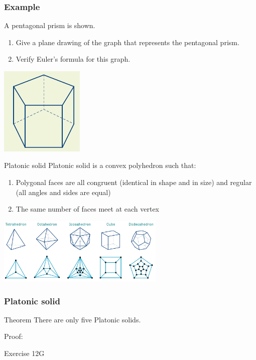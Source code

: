 \documentclass[
	11pt, %
]{beamer}
\begin{document}
\begin{frame}[t]
    \frametitle{Example}
    A pentagonal prism is shown.
    \begin{enumerate}
        \item Give a plane drawing of the graph that represents the
        pentagonal prism.
        \item Verify Euler’s formula for this graph.
    \end{enumerate}
    \includegraphics[width=4cm]{Poly2.png}
\end{frame}

\begin{frame}{Platonic solid}
    Platonic solid is a convex polyhedron such that:
    \begin{enumerate}
        \item Polygonal faces are all congruent (identical in shape and in size) and regular (all angles and sides are equal)
        \item The same number of faces meet at each vertex
    \end{enumerate}
    \begin{center}
        \includegraphics[width=8cm]{Poly3.png}
    \end{center}

\end{frame}

\begin{frame}[t]
    \frametitle{Platonic solid}
    \begin{block}{Theorem}
        There are only five Platonic solids.
    \end{block}
    Proof:
\end{frame}

\begin{frame}{Exercise 12G}
\end{frame}
\end{document}
